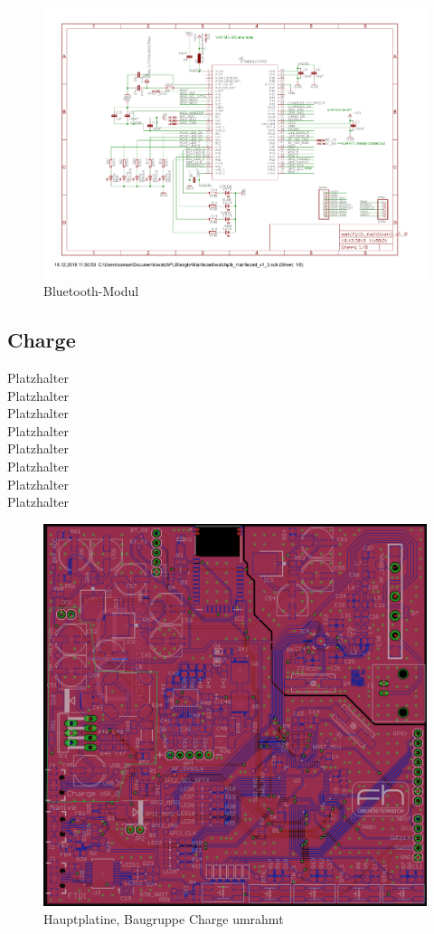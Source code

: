 \documentclass[a4paper]{scrartcl}
\begin{document}
\begin{figure}[H]\centering
\includegraphics[page=5, angle=90, width=\linewidth]{../eagle/Mainboard/watchplb_mainboard_v1_0.pdf}
\caption{Bluetooth-Modul}
\label{fig:abb1}
\end{figure}

\subsection{Charge}

Platzhalter\\Platzhalter\\Platzhalter\\Platzhalter\\Platzhalter\\Platzhalter\\
Platzhalter\\Platzhalter

\begin{figure}[H]\centering
\includegraphics[page=1, angle=0, width=\linewidth]{../Documentation/pics/mainboard_charge.png}
\caption{Hauptplatine, Baugruppe Charge umrahmt}
\label{fig:abb1}
\end{figure}
\end{document}
